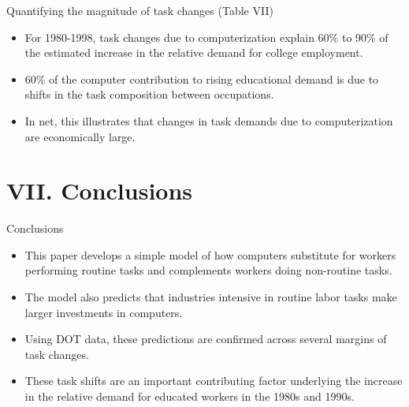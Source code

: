 \documentclass[notes=show]{beamer}
\begin{document}
\begin{frame}{Quantifying the magnitude of task changes (Table VII)}
\begin{itemize}
\item For 1980-1998, task changes due to computerization explain 60\% to 90\% of the estimated increase in the relative demand for college employment. \medskip
\item 60\% of the computer contribution to rising educational demand is due to shifts in the task composition between occupations. \medskip
\item In net, this illustrates that changes in task demands due to computerization are economically large.  
\end{itemize}
\end{frame}

\section{VII. Conclusions}

\begin{frame}{Conclusions}
\begin{itemize}
\item This paper develops a simple model of how computers substitute for workers performing routine tasks and complements workers doing non-routine tasks. \medskip
\item The model also predicts that industries intensive in routine labor tasks make larger investments in computers. \medskip
\item Using DOT data, these predictions are confirmed across several margins of task changes. \medskip
\item These task shifts are an important contributing factor underlying the increase in the relative demand for educated workers in the 1980s and 1990s.
\end{itemize}
\end{frame}
\end{document}
